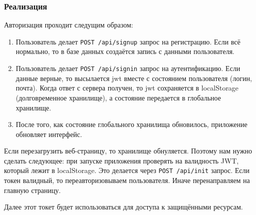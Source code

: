 \subsubsection{Реализация}
Авторизация проходит следущим образом:
\begin{enumerate}
    \item Пользователь делает \texttt{POST /api/signup} запрос на регистрацию. Если всё нормально, то в базе данных создаётся запись с данными пользователя.
    \item Пользователь делает \texttt{POST /api/signin} запрос на аутентификацию. Если данные верные, то высылается \acrshort{jwt} вместе с состоянием пользователя (логин, почта). Когда ответ с сервера получен, то \acrshort{jwt} сохраняется в localStorage (долговременное хранилище), а состояние передается в глобальное \textcite{redux} хранилище.
    \item После того, как состояние глобального хранилища обновилось, приложение обновляет интерфейс.
\end{enumerate}

Если перезагрузить веб-страницу, то \textcite{redux} хранилище обнуляется. Поэтому нам нужно сделать следующее: при запуске приложения проверять на валидность JWT, который лежит в localStorage. Это делается через \texttt{POST /api/init} запрос. Если токен валидный, то переавторизовываем пользователя. Иначе перенаправляем на главную страницу.

Далее этот токет будет использоваться для доступа к защищёнными ресурсам.

